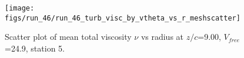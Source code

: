 \begin{figure}[H]
\centering
\texttt{[image: figs/run\_46/run\_46\_turb\_visc\_by\_vtheta\_vs\_r\_meshscatter]}
\caption{Scatter plot of mean total viscosity $\nu$ vs radius at $z/c$=9.00, $V_{free}$=24.9, station 5.}
\label{fig:run_46_turb_visc_by_vtheta_vs_r_meshscatter}
\end{figure}



